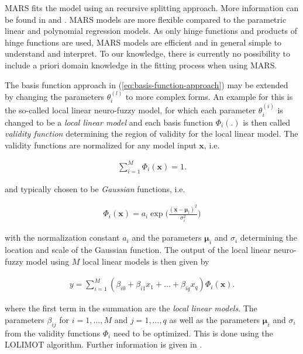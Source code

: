 \documentclass[10pt,a4paper]{article}
\begin{document}
MARS fits the model using an recursive splitting approach. More information can be found in \cite{friedman1991multivariate} and \cite{friedman2001elements}. MARS models are more flexible compared to the parametric linear and polynomial regression models. As only hinge functions and products of hinge functions are used, MARS models are efficient and in general simple to understand and interpret. To our knowledge, there is currently no possibility to include a priori domain knowledge in the fitting process when using MARS. 

The basis function approach in (\ref{eq:basis-function-approach}) may be extended by changing the parameters $\theta_i^{(l)}$ to more complex forms. An example for this is the so-called local linear neuro-fuzzy model, for which each parameter $\theta_i^{(i)}$ is changed to be a \emph{local linear model} and each basis function $\Phi_i(.)$ is then called \emph{validity function} determining the region of validity for the local linear model. \cite{nelles2013nonlinear} The validity functions are normalized for any model input $\boldsymbol{x}$, i.e.

\begin{align} \label{eq:LILOMOT-normalized-basis-fucntions}
	\sum_{i=1}^M \Phi_i(\boldsymbol{x}) = 1.
\end{align}

and typically chosen to be \emph{Gaussian} functions, i.e. 

\begin{align} \label{eq:validity-function}
	\Phi_i(\boldsymbol{x}) = a_i \exp \big(\frac{(\boldsymbol{x} - \boldsymbol{\mu}_i)^2}{\sigma_i^2} \big)	
\end{align}

with the normalization constant $a_i$ and the parameters $\boldsymbol{\mu}_i$ and $\sigma_i$ determining the location and scale of the Gaussian function. The output of the local linear neuro-fuzzy model using $M$ local linear models is then given by

\begin{align} \label{eq:LOLIMOT}
	y = \sum_{i=1}^M (\beta_{i0} + \beta_{i1} x_1 + \dots + \beta_{iq} x_q) \Phi_i(\boldsymbol{x}).
\end{align}

where the first term in the summation are the \emph{local linear models}. The parameters $\beta_{ij}$ for $i=1, \dots, M$ and $j=1, \dots, q$ as well as the parameters $\boldsymbol{\mu}_i$ and $\sigma_i$ from the validity functions $\Phi_i$ need to be optimized. This is done using the LOLIMOT algorithm. Further information is given in \cite{nelles2013nonlinear}. 
\end{document}
